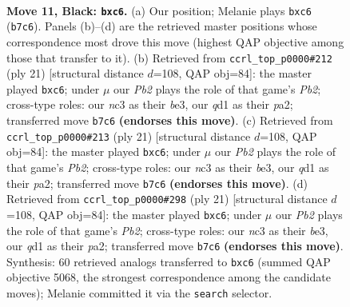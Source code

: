 \documentclass[11pt]{article}
\begin{document}
\clearpage

\begin{figure}[p]\centering
\begin{subfigure}{0.46\textwidth}\centering
\resizebox{\linewidth}{!}{%
\newchessgame
\chessboard[
  setfen={1rbqr1k1/pp1pppbp/2N3p1/8/2P1n2P/2N3P1/PP3PB1/R1BQ1RK1 b - - 0 11},
  showmover=false,
  pgfstyle=straightmove, color=movearrow, markmove={b7-c6}
]}
\caption{}
\end{subfigure}\hfill
\begin{subfigure}{0.46\textwidth}\centering
\resizebox{\linewidth}{!}{%
\newchessgame
\chessboard[
  setfen={r1bq1rk1/pp2ppbp/2N3p1/3n4/8/2N1BP2/PPPQ2PP/2KR1B1R b - - 0 11},
  showmover=false,
  pgfstyle=straightmove, color=movearrow, markmove={b7-c6}
]}
\caption{}
\end{subfigure}
\\[4pt]
\begin{subfigure}{0.46\textwidth}\centering
\resizebox{\linewidth}{!}{%
\newchessgame
\chessboard[
  setfen={r1bq1rk1/pp2ppbp/2N3p1/3n4/8/2N1BP2/PPPQ2PP/2KR1B1R b - - 0 11},
  showmover=false,
  pgfstyle=straightmove, color=movearrow, markmove={b7-c6}
]}
\caption{}
\end{subfigure}\hfill
\begin{subfigure}{0.46\textwidth}\centering
\resizebox{\linewidth}{!}{%
\newchessgame
\chessboard[
  setfen={r1bq1rk1/pp2ppbp/2N3p1/3n4/8/2N1BP2/PPPQ2PP/2KR1B1R b - - 0 11},
  showmover=false,
  pgfstyle=straightmove, color=movearrow, markmove={b7-c6}
]}
\caption{}
\end{subfigure}
\caption{\textbf{Move 11, Black: \texttt{bxc6}.} (a) Our position; Melanie plays \texttt{bxc6} (\texttt{b7c6}). Panels (b)--(d) are the retrieved master positions whose correspondence most drove this move (highest QAP objective among those that transfer to it). (b) Retrieved from \texttt{ccrl\_top\_p0000\#212} (ply 21) [structural distance $d$=108, QAP obj=84]: the master played \texttt{bxc6}; under $\mu$ our \emph{Pb2} plays the role of that game's \emph{Pb2}; cross-type roles: our \emph{n}c3 as their \emph{b}e3, our \emph{q}d1 as their \emph{p}a2; transferred move \texttt{b7c6} \textbf{(endorses this move)}. (c) Retrieved from \texttt{ccrl\_top\_p0000\#213} (ply 21) [structural distance $d$=108, QAP obj=84]: the master played \texttt{bxc6}; under $\mu$ our \emph{Pb2} plays the role of that game's \emph{Pb2}; cross-type roles: our \emph{n}c3 as their \emph{b}e3, our \emph{q}d1 as their \emph{p}a2; transferred move \texttt{b7c6} \textbf{(endorses this move)}. (d) Retrieved from \texttt{ccrl\_top\_p0000\#298} (ply 21) [structural distance $d$=108, QAP obj=84]: the master played \texttt{bxc6}; under $\mu$ our \emph{Pb2} plays the role of that game's \emph{Pb2}; cross-type roles: our \emph{n}c3 as their \emph{b}e3, our \emph{q}d1 as their \emph{p}a2; transferred move \texttt{b7c6} \textbf{(endorses this move)}. Synthesis: 60 retrieved analogs transferred to \texttt{bxc6} (summed QAP objective 5068, the strongest correspondence among the candidate moves); Melanie committed it via the \texttt{search} selector.}
\label{fig:thought-m21}
\end{figure}
\end{document}
